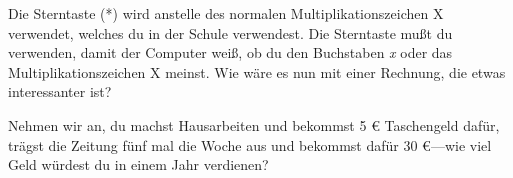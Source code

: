 Die Sterntaste (*) wird anstelle des normalen Multiplikationszeichen \textsf{X} verwendet, welches du in der Schule verwendest. Die Sterntaste mußt du verwenden, damit der Computer weiß, ob du den Buchstaben \emph{x} oder das Multiplikationszeichen \textsf{X} meinst. Wie wäre es nun mit einer Rechnung, die etwas interessanter ist?

Nehmen wir an, du machst Hausarbeiten und bekommst 5 € Taschengeld dafür, trägst die Zeitung fünf mal die Woche aus und bekommst dafür 30 €---wie viel Geld würdest du in einem Jahr verdienen?

